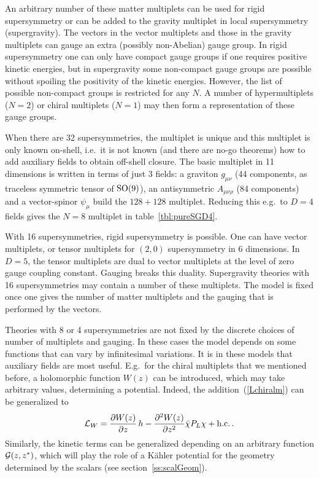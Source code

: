 \documentclass[a4paper,11pt,twoside]{article}
\newcommand{\Red}[1]{#1}
\newcommand{\OliveGreen}[1]{#1}
\newcommand{\Blue}[1]{#1}
\newcommand{\Maroon}[1]{#1}
\newcommand{\hc}{{\rm h.c.}}
\newcommand{\SO}{\mathop{\rm SO}}
\begin{document}
An arbitrary number of these matter multiplets can be used for rigid
supersymmetry or can be added to the gravity multiplet in local
supersymmetry (supergravity). The vectors in the vector multiplets and
those in the gravity multiplets can gauge an extra (possibly non-Abelian)
gauge group. In rigid supersymmetry one can only have compact gauge
groups if one requires positive kinetic energies, but in supergravity
some non-compact gauge groups are possible without spoiling the
positivity of the kinetic energies. However, the list of possible
non-compact groups is restricted for any $N$. A number of hypermultiplets
($N=2$) or chiral multiplets ($N=1$) may then form a representation of
these gauge groups.

When there are 32 supersymmetries, the multiplet is unique and this
multiplet is only known on-shell, i.e.\ it is not known (and there are
no-go theorems) how to add auxiliary fields to obtain off-shell closure.
The basic multiplet in 11 dimensions is written in terms of just 3
fields: a graviton $\Maroon{g_{\mu \nu }}$ (44 components, as traceless
symmetric tensor of $\SO(9)$), an antisymmetric $\Maroon{A_{\mu \nu \rho
}}$ (84 components) and a vector-spinor $\Red{\psi _\mu}$ build the
$128+128$ multiplet. Reducing this e.g.\ to $D=4$ fields gives the $N=8$
multiplet in table~\ref{tbl:pureSGD4}.

With 16 supersymmetries, rigid supersymmetry is possible. One can have
vector multiplets, or tensor multiplets for $(2,0)$ supersymmetry in 6
dimensions. In $D=5$, the tensor multiplets are dual to vector multiplets
at the level of zero gauge coupling constant. Gauging breaks this
duality. Supergravity theories with 16 supersymmetries may contain a
number of these multiplets. The model is fixed once one gives the number
of matter multiplets and the gauging that is performed by the vectors.

Theories with 8 or 4 supersymmetries are not fixed by the discrete
choices of number of multiplets and gauging. In these cases the model
depends on some functions that can vary by infinitesimal variations. It
is in these models that auxiliary fields are most useful. E.g.\ for the
chiral multiplets that we mentioned before, a holomorphic function
$\OliveGreen{W}(\Blue{z})$ can be introduced, which may take arbitrary
values, determining a potential. Indeed, the addition~(\ref{Lchiralm})
can be generalized to
\begin{equation}
  {\cal L}_W= \frac{\partial \OliveGreen{W}(\Blue{z})}{\partial \Blue{z}}\,\Red{h}
-\frac{\partial ^2\OliveGreen{W}(\Blue{z})}{\partial
\Blue{z}^2}\Blue{\bar \chi} P_L \Blue{\chi} +\hc \,.
 \label{LchiralW}
\end{equation}
Similarly, the kinetic terms can be generalized depending on an arbitrary
function ${\cal G}(z,z^*)$, which will play the role of a K{\"a}hler
potential for the geometry determined by the scalars (see
section~\ref{ss:scalGeom}).
\end{document}
